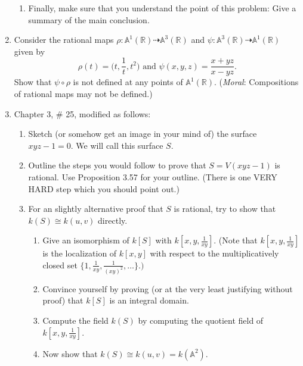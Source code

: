 \documentclass[11pt]{report}
\newcommand\RR{{\mathbb R}}
\newcommand\A{{\mathbb A}}
\begin{document}
\begin{enumerate}
\begin{enumerate}
\item Finally, make sure that you understand the point of this problem:  Give a summary of the
main conclusion.

\end{enumerate}

\item Consider the rational maps $\rho: \A^1(\RR) \dasharrow \A^3(\RR)$ and 
$\psi: \A^3(\RR) \dasharrow \A^1(\RR)$ given by
$$
\rho(t) = \big(t, \frac{1}{t}, t^2\big) \text{ and } \psi(x,y,z) = \frac{x+yz}{x-yz}.
$$
Show that $\psi \circ \rho$ is not defined at any points of $\A^1(\RR)$.
(\emph{Moral}: Compositions of rational maps may not be defined.)


\item Chapter 3, \# 25, modified as follows:

\begin{enumerate}

\item Sketch (or somehow get an image in your mind of) the surface $xyz-1=0$.  We will call this
surface $S$.

\item Outline the steps you would follow to prove that $S = V(xyz-1)$ is rational.   Use
Proposition 3.57 for your outline.   (There is one VERY HARD step which you should point out.)

\item For an slightly alternative proof that $S$ is rational, try to show that $k(S) \cong k(u,v)$ directly.

\begin{enumerate}

\item Give an isomorphism of $k[S]$ with $k[x,y,\frac{1}{xy}]$.  (Note that $k[x,y,\frac{1}{xy}]$
is the localization of $k[x,y]$ with respect to the multiplicatively closed set $\{1, \frac{1}{xy},  
\frac{1}{(xy)^2}, \dots\}.)$

\item Convince yourself by proving (or at the very least justifying without proof) that $k[S]$ is an
integral domain.

\item Compute the field $k(S)$ by computing the quotient field of $k[x,y,\frac{1}{xy}]$.

\item Now show that $k(S) \cong k(u,v) = k(\A^2)$.

\end{enumerate}

\end{enumerate}

\end{enumerate}
\end{document}
